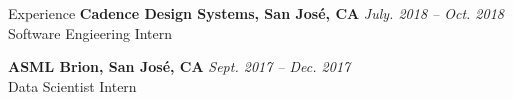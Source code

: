\begin{rSection}{Experience}
{\bf Cadence Design Systems, San Jos\'{e}, CA}         \hfill {\em July. 2018 -- Oct. 2018} \\
Software Engieering Intern
	
{\bf ASML Brion, San Jos\'{e}, CA}         \hfill {\em Sept. 2017 -- Dec. 2017} \\
Data Scientist Intern



\end{rSection}


